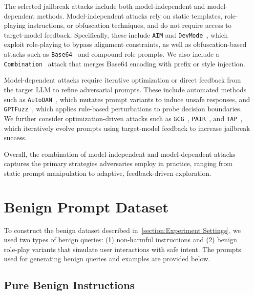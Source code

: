 \documentclass[letterpaper,twocolumn,10pt]{article}
\begin{document}
The selected jailbreak attacks include both model-independent and model-dependent methods.
Model-independent attacks rely on static templates, role-playing instructions, or obfuscation techniques, and do not require access to target-model feedback.
Specifically, these include \texttt{AIM} and \texttt{DevMode}~\cite{SCBSZ24}, which exploit role-playing to bypass alignment constraints, as well as obfuscation-based attacks such as \texttt{Base64}~\cite{RVNAC23} and compound role prompts.
We also include a \texttt{Combination}~\cite{WHS23} attack that merges Base64 encoding with prefix or style injection.

Model-dependent attacks require iterative optimization or direct feedback from the target LLM to refine adversarial prompts.
These include automated methods such as \texttt{AutoDAN}~\cite{LXCX23}, which mutates prompt variants to induce unsafe responses, and \texttt{GPTFuzz}~\cite{YLYX23}, which applies rule-based perturbations to probe decision boundaries.
We further consider optimization-driven attacks such as \texttt{GCG}~\cite{ZWCNKF23}, \texttt{PAIR}~\cite{CRDHPW25}, and \texttt{TAP}~\cite{MZKNASK23}, which iteratively evolve prompts using target-model feedback to increase jailbreak success.

Overall, the combination of model-independent and model-dependent attacks captures the primary strategies adversaries employ in practice, ranging from static prompt manipulation to adaptive, feedback-driven exploration.

\section{Benign Prompt Dataset}
\label{appendix:benign}

To construct the benign dataset described in~\autoref{section:Experiment Settings}, we used two types of benign queries: (1) non-harmful instructions and (2) benign role-play variants that simulate user interactions with safe intent.
The prompts used for generating benign queries and examples are provided below.

\subsection{Pure Benign Instructions}
\end{document}
